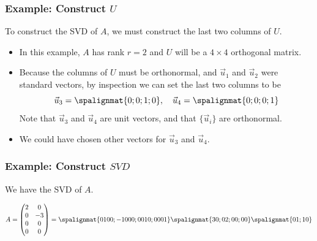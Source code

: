 \begin{frame}\frametitle{Example: Construct $U$}  

    To construct the SVD of $A$, we must construct the last two columns of $U$. 
    \begin{itemize}
        \item<2-> In this example, $A$ has rank $r=2$ and $U$ will be a $4 \times 4$ orthogonal matrix.
        \item<3-> Because the columns of $U$ must be orthonormal, and $\vec u_1$ and $\vec u_2$ were standard vectors, by inspection we can set the last two columns to be
        $$\vec u_3 = \spalignmat{0;0;1;0}, \quad \vec u_4 = \spalignmat{0;0;0;1}$$  
        Note that $\vec u_3$ and $\vec u_4$ are unit vectors, and that $\{\vec u_i\}$ are orthonormal. 
        \item<4-> We could have chosen other vectors for $\vec u_3$ and $\vec u_4$.
    \end{itemize}
    
\end{frame}




\begin{frame}\frametitle{Example: Construct $SVD$}  

    We have the SVD of $A$. 
    
    $$A = \begin{pmatrix}
    2 & 0 \\ 0 & -3 \\ 0 & 0 \\ 0 & 0 
    \end{pmatrix}
    = 
    \spalignmat{0 1 0 0;-1 0 0 0;0 0 1 0;0 0 0 1}
    \spalignmat{3 0;0 2;0 0;0 0}
    \spalignmat{0 1;1 0}
    $$
    
\end{frame}











